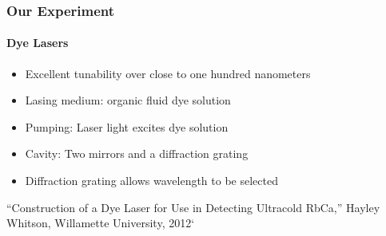 \documentclass{beamer}
\begin{document}
\begin{frame}
  \frametitle{Our Experiment}
  \framesubtitle{Dye Lasers}
  \begin{itemize}
	\item Excellent tunability over close to one hundred nanometers
	\item Lasing medium: organic fluid dye solution 
	\item Pumping: Laser light excites dye solution
	\item Cavity: Two mirrors and a diffraction grating
	\item Diffraction grating allows wavelength to be selected
  \end{itemize}
  \bigskip
  { \tiny``Construction of a Dye Laser for Use in Detecting Ultracold RbCa,'' Hayley Whitson, Willamette University, 2012`}

\end{frame}
\end{document}
